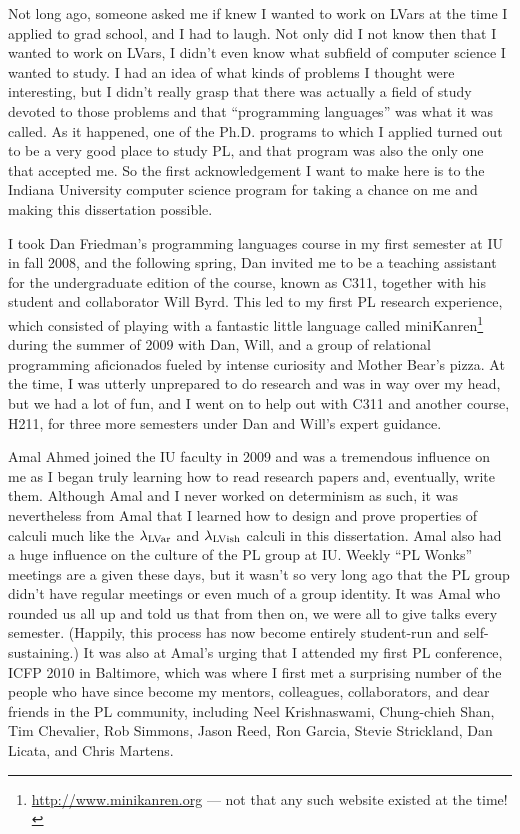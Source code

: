 Not long ago, someone asked me if knew I wanted to work on LVars at
the time I applied to grad school, and I had to laugh.  Not only did I
not know then that I wanted to work on LVars, I didn't even know what
subfield of computer science I wanted to study.  I had an idea of what
kinds of problems I thought were interesting, but I didn't really
grasp that there was actually a field of study devoted to those
problems and that ``programming languages'' was what it was called.
As it happened, one of the Ph.D. programs to which I applied turned
out to be a very good place to study PL, and that program was also the
only one that accepted me.  So the first acknowledgement I want to
make here is to the Indiana University computer science program for
taking a chance on me and making this dissertation possible.

I took Dan Friedman's programming languages course in my first
semester at IU in fall 2008, and the following spring, Dan invited me
to be a teaching assistant for the undergraduate edition of the
course, known as C311, together with his student and collaborator Will
Byrd.  This led to my first PL research experience, which consisted of
playing with a fantastic little language called
miniKanren\footnote{\url{http://www.minikanren.org} --- not that any
such website existed at the time!} during the summer of 2009 with Dan,
Will, and a group of relational programming aficionados fueled by
intense curiosity and Mother Bear's pizza.  At the time, I was utterly
unprepared to do research and was in way over my head, but we had a
lot of fun, and I went on to help out with C311 and another course,
H211, for three more semesters under Dan and Will's expert guidance.

Amal Ahmed joined the IU faculty in 2009 and was a tremendous
influence on me as I began truly learning how to read research papers
and, eventually, write them.  Although Amal and I never worked on
determinism as such, it was nevertheless from Amal that I learned how
to design and prove properties of calculi much like the $\lambda_{\textrm{LVar}}$
and $\lambda_{\textrm{LVish}}$ calculi in this dissertation.  Amal also had a huge
influence on the culture of the PL group at IU.  Weekly ``PL Wonks''
meetings are a given these days, but it wasn't so very long ago that
the PL group didn't have regular meetings or even much of a group
identity.  It was Amal who rounded us all up and told us that from
then on, we were all to give talks every semester.  (Happily, this
process has now become entirely student-run and self-sustaining.)  It
was also at Amal's urging that I attended my first PL conference, ICFP
2010 in Baltimore, which was where I first met a surprising number of
the people who have since become my mentors, colleagues,
collaborators, and dear friends in the PL community, including Neel
Krishnaswami, Chung-chieh Shan, Tim Chevalier, Rob Simmons, Jason
Reed, Ron Garcia, Stevie Strickland, Dan Licata, and Chris Martens.

